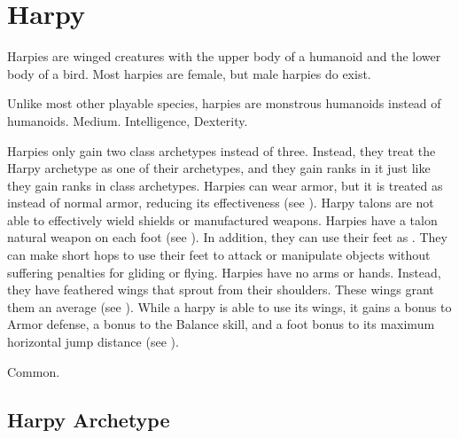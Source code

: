 \section{Harpy}
  Harpies are winged creatures with the upper body of a humanoid and the lower body of a bird.
  Most harpies are female, but male harpies do exist.

   Unlike most other playable species, harpies are monstrous humanoids instead of humanoids.
   Medium.
    Intelligence,  Dexterity.
  \begin{itemize}
     Harpies only gain two class archetypes instead of three.
      Instead, they treat the Harpy archetype as one of their archetypes, and they gain ranks in it just like they gain ranks in class archetypes.
     Harpies can wear armor, but it is treated as  instead of normal armor, reducing its effectiveness (see ).
      Harpy talons are not able to effectively wield shields or manufactured weapons.
     Harpies have a talon natural weapon on each foot (see ).
      In addition, they can use their feet as .
      They can make short hops to use their feet to attack or manipulate objects without suffering penalties for gliding or flying.
     Harpies have no arms or hands.
      Instead, they have feathered wings that sprout from their shoulders.
      These wings grant them an average  (see ).
     While a harpy is able to use its wings, it gains a  bonus to Armor defense, a  bonus to the Balance skill, and a  foot bonus to its maximum horizontal jump distance (see ).
  \end{itemize}
   Common.

  \subsection{Harpy Archetype}

